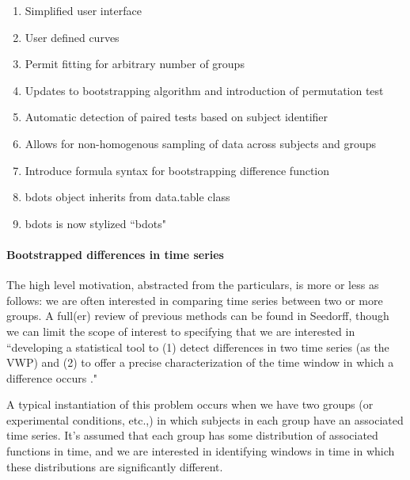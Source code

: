 \documentclass{article}
\begin{document}
\begin{enumerate}
\item Simplified user interface
\item User defined curves
\item Permit fitting for arbitrary number of groups
\item Updates to bootstrapping algorithm and introduction of permutation test
\item Automatic detection of paired tests based on subject identifier
\item Allows for non-homogenous sampling of data across subjects and groups
\item Introduce formula syntax for bootstrapping difference function
\item bdots object inherits from data.table class
\item bdots is now stylized ``bdots"
\end{enumerate}

\paragraph{Bootstrapped differences in time series}

The high level motivation, abstracted from the particulars, is more or less as follows: we are often interested in comparing time series between two or more groups. A full(er) review of previous methods can be found in Seedorff,  though we can limit the scope of interest to specifying that we are interested in ``developing a statistical tool to (1) detect differences in two time series (as the VWP) and (2) to offer a precise characterization of the time window in which a difference occurs \cite{seedorff2018bdots}."

A typical instantiation of this problem occurs when we have two groups (or experimental conditions, etc.,) in which subjects in each group have an associated time series. It's assumed that each group has some distribution of associated functions in time, and we are interested in identifying windows in time in which these distributions are significantly different.
\end{document}
